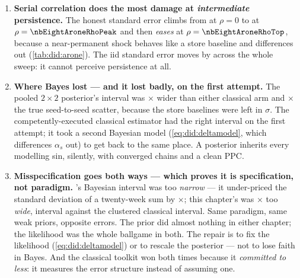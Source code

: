 \begin{enumerate}[leftmargin=*, itemsep=.45em]
  \item \textbf{Serial correlation does the most damage at \emph{intermediate} persistence.} The
        honest standard error climbs from \eur{\nbEightAroneSeZero} at $\rho = 0$ to
        \eur{\nbEightAroneSePeak} at $\rho = \nbEightAroneRhoPeak$ and then \emph{eases} at
        $\rho = \nbEightAroneRhoTop$, because a near-permanent shock behaves like a store baseline
        and differences out (\cref{tab:did:arone}). The iid standard error moves by
        \eur{\nbEightAroneIidSpread} across the whole sweep: it cannot perceive persistence at all.

  \item \textbf{Where Bayes lost --- and it lost badly, on the first attempt.} The pooled
        $2 \times 2$ posterior's interval was \nbEightBayesOverCluster$\times$ wider than either
        classical arm and \nbEightPooledOverScatter$\times$ the true seed-to-seed scatter, because
        the store baselines were left in $\sigma$. The competently-executed classical estimator had
        the right interval on the first attempt; it took a second Bayesian model
        (\cref{eq:did:deltamodel}, which differences $\alpha_s$ out) to get back to the same place.
        A posterior inherits every modelling sin, silently, with converged chains and a clean PPC.

  \item \textbf{Misspecification goes both ways --- which proves it is specification, not
        paradigm.} \Refgeo{}'s Bayesian interval was too \emph{narrow} --- it under-priced the
        standard deviation of a twenty-week sum by \nbSevenUnderprice$\times$; this chapter's was
        \nbEightBayesOverCluster$\times$ too \emph{wide}, interval against the clustered classical
        interval. Same paradigm, same weak priors, opposite errors. The prior did almost nothing in either chapter;
        the likelihood was the whole ballgame in both. The repair is to fix the likelihood
        (\cref{eq:did:deltamodel}) or to rescale the posterior \citep{mueller2013} --- not to lose
        faith in Bayes. And the classical toolkit won both times because it \emph{committed to
        less}: it measures the error structure instead of assuming one.


\end{enumerate}
